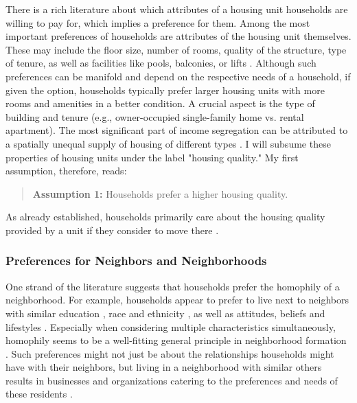 \documentclass[a4paper,12pt]{article}
\begin{document}
There is a rich literature about which attributes of a housing unit households are willing to pay for, which implies a preference for them. Among the most important preferences of households are attributes of the housing unit themselves. These may include the floor size, number of rooms, quality of the structure, type of tenure, as well as facilities like pools, balconies, or lifts \citep{chauCriticalReviewLiterature2003, bayerEquilibriumModelSorting2004, bruecknerLecturesUrbanEconomics2011}. Although such preferences can be manifold and depend on the respective needs of a household, if given the option, households typically prefer larger housing units with more rooms and amenities in a better condition. A crucial aspect is the type of building and tenure (e.g., owner-occupied single-family home vs. rental apartment). The most significant part of income segregation can be attributed to a spatially unequal supply of housing of different types \citep{loufPatternsResidentialSegregation2016, oecdDividedCitiesUnderstanding2018, owensBuildingInequalityHousing2019}. I will subsume these properties of housing units under the label "housing quality." My first assumption, therefore, reads:

\begin{quotation}
\textbf{Assumption 1:} Households prefer a higher housing quality.
\end{quotation}

As already established, households primarily care about the housing quality provided by a unit if they consider to move there \citep{chauCriticalReviewLiterature2003, bayerEquilibriumModelSorting2004, mummoloWhyPartisansNot2017, delucaNotJustLateral2020}.


\subsubsection{Preferences for Neighbors and Neighborhoods}

One strand of the literature suggests that households prefer the homophily of a neighborhood. For example, households appear to prefer to live next to neighbors with similar education \citep{bayerUnifiedFrameworkMeasuring2007, bruchChoiceSetFormation2019}, race and ethnicity \citep{krysanDoesRaceMatter2009, bruchChoiceSetFormation2019}, as well as attitudes, beliefs and lifestyles \citep{mummoloWhyPartisansNot2017}. Especially when considering multiple characteristics simultaneously, homophily seems to be a well-fitting general principle in neighborhood formation \citep{loganBirdsFeatherSocial2016}. Such preferences might not just be about the relationships households might have with their neighbors, but living in a neighborhood with similar others results in businesses and organizations catering to the preferences and needs of these residents \citep{bruecknerWhyCentralParis1999}.
\end{document}
